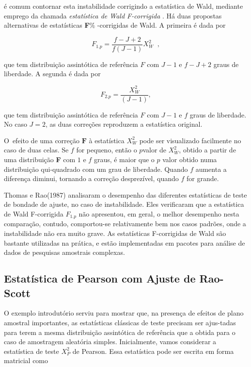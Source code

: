 \documentclass[]{book}
\numberwithin{example}{chapter}
\numberwithin{remark}{chapter}
\numberwithin{definition}{chapter}
\begin{document}
é comum contornar esta instabilidade corrigindo a estatística de Wald,
mediante emprego da chamada \emph{estatística de Wald F-corrigida} . Há
duas propostas alternativas de estatísticas \textbf{F}\% -corrigidas de
Wald. A primeira é dada por

\begin{equation}
F_{1.p}=\frac{f-J+2}{f\left( J-1\right) }X_{W}^{2}\;\;,  
\label{eq:qual9}
\end{equation}

que tem distribuição assintótica de referência \(F\) com \(J-1\) e
\(f-J+2\) graus de liberdade. A segunda é dada por

\begin{equation}
F_{2.p}=\frac{X_{W}^{2}}{\left( J-1\right) },  
\label{eq:qual10}
\end{equation}

que tem distribuição assintótica de referência \(F\) com \(J-1\) e \(f\)
graus de liberdade. No caso \(J=2\), as duas correções reproduzem a
estatística original.

O~efeito de uma correção \(\mathbf{F}\) à estatística \(X_{W}^{2}\) pode
ser visualizado facilmente no caso de duas celas. Se \(f\) for pequeno,
então o \(p\)valor de \(X_{W}^{2}\), obtido a partir de uma distribuição
\textbf{F} com \(1\) e \(f\) graus, é maior que o \(p\) valor obtido
numa distribuição qui-quadrado com um grau de liberdade. Quando \(f\)
aumenta a diferença diminui, tornando a correção desprezível, quando
\(f\) for grande.

Thomas e Rao(1987) analisaram o desempenho das diferentes estatísticas
de teste de bondade de ajuste, no caso de instabilidade. Eles
verificaram que a estatística de Wald F-corrigida \(F_{1.p}\) não
apresentou, em geral, o melhor desempenho nesta comparação, contudo,
comportou-se relativamente bem nos casos padrões, onde a instabilidade
não era muito grave. As estatísticas F-corrigidas de Wald são bastante
utilizadas na prática, e estão implementadas em pacotes para análise de
dados de pesquisas amostrais complexas.

\subsection{Estatística de Pearson com Ajuste de
Rao-Scott}\label{raoscott}

O exemplo introdutório serviu para mostrar que, na presença de efeitos
de plano amostral importantes, as estatísticas clássicas de teste
precisam ser ajus-tadas para terem a mesma distribuição assintótica de
referência que a obtida para o caso de amostragem aleatória simples.
Inicialmente, vamos considerar a estatística de teste \(X_{P}^{2}\) de
Pearson\(.\) Essa estatística pode ser escrita em forma matricial como
\end{document}
